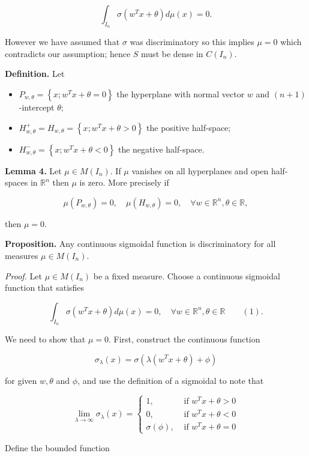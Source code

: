 $$
\int_{I_n}\sigma(w^Tx+\theta)d\mu(x)=0.
$$

However we have assumed that $\sigma$ was discriminatory so this implies $\mu=0$ which contradicts our assumption; hence $S$ must be dense in $C(I_n)$.

\textbf{Definition.}
Let

\begin{itemize}
  \item $P_{w,\theta}=\left\{x;w^Tx+\theta=0\right\}$ the hyperplane with normal vector $w$ and $(n+1)$-intercept $\theta$;
  \item $H^+_{w,\theta}=H_{w,\theta}=\left\{x;w^Tx+\theta>0\right\}$ the positive half-space;
  \item $H^-_{w,\theta}=\left\{x;w^Tx+\theta < 0\right\}$ the negative half-space.
\end{itemize}

\textbf{Lemma 4.} Let $\mu \in M(I_n)$. If $\mu$ vanishes on all hyperplanes and open half-spaces in $\mathbb{R}^n$ then $\mu$ is zero. More precisely if

$$
\mu(P_{w,\theta})=0, \quad \mu(H_{w,\theta})=0, \quad \forall w\in\mathbb{R}^n, \theta\in\mathbb{R},
$$

then $\mu=0$.

\textbf{Proposition.} Any continuous sigmoidal function is discriminatory for all measures $\mu \in M(I_n)$.

\textit{Proof.} Let $\mu\in M(I_n)$ be a fixed measure. Choose a continuous sigmoidal function that satisfies

$$
\int_{I_n}\sigma(w^Tx+\theta)d\mu(x)=0, \quad \forall w\in\mathbb{R}^n, \theta\in\mathbb{R} \qquad (1).
$$

We need to show that $\mu=0$. First, construct the continuous function

$$
\sigma_{\lambda}(x)=\sigma\left(\lambda\left(w^T x+\theta\right)+\phi\right)
$$

for given $w, \theta$ and $\phi$, and use the definition of a sigmoidal to note that

$$
\lim_{\lambda \rightarrow \infty} \sigma_\lambda(x)=\left\{\begin{array}{ll}
1, & \text { if } w^T x+\theta>0 \\
0, & \text { if } w^T x+\theta<0 \\
\sigma(\phi), & \text { if } w^T x+\theta=0
\end{array} \right.
$$

Define the bounded function


